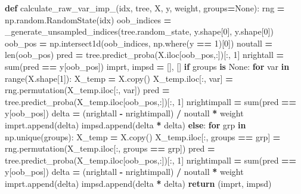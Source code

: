 \documentclass[
  11pt,
  oneside]{book}
\newenvironment{Shaded}{\begin{snugshade}}{\end{snugshade}}
\newcommand{\BuiltInTok}[1]{#1}
\newcommand{\ControlFlowTok}[1]{\textcolor[rgb]{0.13,0.29,0.53}{\textbf{#1}}}
\newcommand{\DecValTok}[1]{\textcolor[rgb]{0.00,0.00,0.81}{#1}}
\newcommand{\KeywordTok}[1]{\textcolor[rgb]{0.13,0.29,0.53}{\textbf{#1}}}
\newcommand{\NormalTok}[1]{#1}
\newcommand{\OperatorTok}[1]{\textcolor[rgb]{0.81,0.36,0.00}{\textbf{#1}}}
\newcommand{\VariableTok}[1]{\textcolor[rgb]{0.00,0.00,0.00}{#1}}
\begin{document}
\begin{Shaded}
\begin{Highlighting}[]
\KeywordTok{def}\NormalTok{ calculate\_raw\_var\_imp\_(idx, tree, X, y, weight, groups}\OperatorTok{=}\VariableTok{None}\NormalTok{):}
\NormalTok{    rng }\OperatorTok{=}\NormalTok{ np.random.RandomState(idx)}
\NormalTok{    oob\_indices }\OperatorTok{=}\NormalTok{ \_generate\_unsampled\_indices(tree.random\_state, y.shape[}\DecValTok{0}\NormalTok{], y.shape[}\DecValTok{0}\NormalTok{])}
\NormalTok{    oob\_pos }\OperatorTok{=}\NormalTok{ np.intersect1d(oob\_indices, np.where(y }\OperatorTok{==} \DecValTok{1}\NormalTok{)[}\DecValTok{0}\NormalTok{])}
\NormalTok{    noutall }\OperatorTok{=} \BuiltInTok{len}\NormalTok{(oob\_pos)}
\NormalTok{    pred }\OperatorTok{=}\NormalTok{ tree.predict\_proba(X.iloc[oob\_pos,:])[:, }\DecValTok{1}\NormalTok{]}
\NormalTok{    nrightall }\OperatorTok{=} \BuiltInTok{sum}\NormalTok{(pred }\OperatorTok{==}\NormalTok{ y[oob\_pos])}
\NormalTok{    imprt, impsd }\OperatorTok{=}\NormalTok{ [], []}
    \ControlFlowTok{if}\NormalTok{ groups }\KeywordTok{is} \VariableTok{None}\NormalTok{:}
        \ControlFlowTok{for}\NormalTok{ var }\KeywordTok{in} \BuiltInTok{range}\NormalTok{(X.shape[}\DecValTok{1}\NormalTok{]):}
\NormalTok{            X\_temp }\OperatorTok{=}\NormalTok{ X.copy()}
\NormalTok{            X\_temp.iloc[:, var] }\OperatorTok{=}\NormalTok{ rng.permutation(X\_temp.iloc[:, var])}
\NormalTok{            pred }\OperatorTok{=}\NormalTok{ tree.predict\_proba(X\_temp.iloc[oob\_pos,:])[:, }\DecValTok{1}\NormalTok{]}
\NormalTok{            nrightimpall }\OperatorTok{=} \BuiltInTok{sum}\NormalTok{(pred }\OperatorTok{==}\NormalTok{ y[oob\_pos])}
\NormalTok{            delta }\OperatorTok{=}\NormalTok{ (nrightall }\OperatorTok{{-}}\NormalTok{ nrightimpall) }\OperatorTok{/}\NormalTok{ noutall }\OperatorTok{*}\NormalTok{ weight}
\NormalTok{            imprt.append(delta)}
\NormalTok{            impsd.append(delta }\OperatorTok{*}\NormalTok{ delta)}
    \ControlFlowTok{else}\NormalTok{:}
        \ControlFlowTok{for}\NormalTok{ grp }\KeywordTok{in}\NormalTok{ np.unique(groups):}
\NormalTok{            X\_temp }\OperatorTok{=}\NormalTok{ X.copy()}
\NormalTok{            X\_temp.iloc[:, groups }\OperatorTok{==}\NormalTok{ grp] }\OperatorTok{=}\NormalTok{ rng.permutation(X\_temp.iloc[:, groups }\OperatorTok{==}\NormalTok{ grp])}
\NormalTok{            pred }\OperatorTok{=}\NormalTok{ tree.predict\_proba(X\_temp.iloc[oob\_pos,:])[:, }\DecValTok{1}\NormalTok{]}
\NormalTok{            nrightimpall }\OperatorTok{=} \BuiltInTok{sum}\NormalTok{(pred }\OperatorTok{==}\NormalTok{ y[oob\_pos])}
\NormalTok{            delta }\OperatorTok{=}\NormalTok{ (nrightall }\OperatorTok{{-}}\NormalTok{ nrightimpall) }\OperatorTok{/}\NormalTok{ noutall }\OperatorTok{*}\NormalTok{ weight}
\NormalTok{            imprt.append(delta)}
\NormalTok{            impsd.append(delta }\OperatorTok{*}\NormalTok{ delta)}
    \ControlFlowTok{return}\NormalTok{ (imprt, impsd)}
  

\end{Highlighting}
\end{Shaded}
\end{document}
